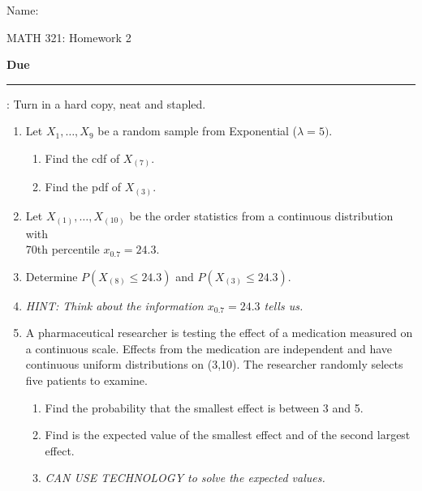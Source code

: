 \documentclass{article}
\newcommand{\blankul}[1]{\rule[-1.5mm]{#1}{0.15mm}}	%
\newcommand{\vecn}[2]{#1_1, \ldots, #1_{#2}}	%
\newcommand{\order}[2]{#1_{(#2)}}		%
\begin{document}
\hspace{375pt}Name:

\begin{center}
{\Huge MATH 321: Homework 2}
\end{center}

\bigskip\bigskip

{\large \textbf{Due} \blankul{4cm}: Turn in a hard copy, neat and stapled.}\bigskip



\begin{enumerate}
    \item Let $\vecn{X}{9}$ be a random sample from Exponential ($\lambda = 5)$.
    \begin{enumerate}%
        \item Find the cdf of $\order{X}{7}$.
        \item Find the pdf of $\order{X}{3}$.
    \end{enumerate}\bigskip
     
    \item Let $\order{X}{1}, \ldots, \order{X}{10}$ be the order statistics from a continuous distribution with \\ 70th percentile $x_{0.7} = 24.3$.
    \item[] Determine $P(\order{X}{8} \le 24.3)$ and $P(\order{X}{3} \le 24.3)$.
    \item[] \textit{HINT: Think about the information $x_{0.7} = 24.3$ tells us.}\bigskip
    
    \item A pharmaceutical researcher is testing the effect of a medication measured on a continuous scale. Effects from the medication are independent and have continuous uniform distributions on (3,10). The researcher randomly selects five patients to examine.
    \begin{enumerate}%
        \item Find the probability that the smallest effect is between 3 and 5.
        \item Find is the expected value of the smallest effect and of the second largest effect.
        \item[] \textit{CAN USE TECHNOLOGY to solve the expected values.}
    \end{enumerate}\bigskip
        

\end{enumerate}
\end{document}
